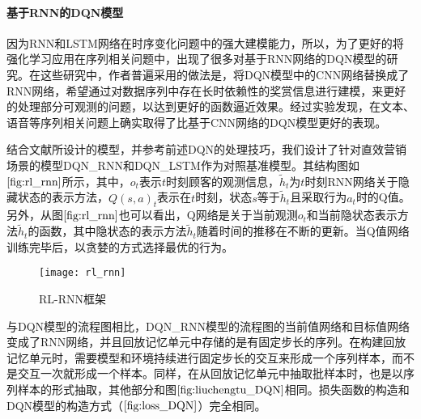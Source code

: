 

\paragraph{基于RNN的DQN模型}
因为RNN和LSTM网络在时序变化问题中的强大建模能力，所以，为了更好的将强化学习应用在序列相关问题中，出现了很多对基于RNN网络的DQN模型的研究\citep{hausknecht2015deep,narasimhan2015language}。在这些研究中，作者普遍采用的做法是，将DQN模型中的CNN网络替换成了RNN网络，希望通过对数据序列中存在长时依赖性的奖赏信息进行建模，来更好的处理部分可观测的问题\citep{bakker2002reinforcement,hausknecht2015deep,lin1993reinforcement,narasimhan2015language}，以达到更好的函数逼近效果。经过实验发现，在文本、语音等序列相关问题上确实取得了比基于CNN网络的DQN模型更好的表现。


结合文献\citep{hausknecht2015deep,narasimhan2015language}所设计的模型，并参考前述DQN的处理技巧，我们设计了针对直效营销场景的模型DQN\_RNN和DQN\_LSTM作为对照基准模型。其结构图如$\ref{fig:rl_rnn}$所示，其中，$o_{t}$表示$t$时刻顾客的观测信息，$\tilde{h}_{t}$为$t$时刻RNN网络关于隐藏状态的表示方法，$Q(s,a)_{t}$表示在$t$时刻，状态$s$等于$\tilde{h}_{t}$且采取行为$a_{t}$时的Q值。另外，从图$\ref{fig:rl_rnn}$也可以看出，Q网络是关于当前观测$o_{t}$和当前隐状态表示方法$\tilde{h}_{t}$的函数，其中隐状态的表示方法$\tilde{h}_{t}$随着时间的推移在不断的更新。当Q值网络训练完毕后，以贪婪的方式选择最优的行为。
\begin{figure}[htbp]
\centering
\texttt{[image: rl\_rnn]}
\caption{RL-RNN框架}
\label{fig:rl_rnn}
\end{figure}

与DQN模型的流程图相比，DQN\_RNN模型的流程图的当前值网络和目标值网络变成了RNN网络，并且回放记忆单元中存储的是有固定步长的序列。在构建回放记忆单元时，需要模型和环境持续进行固定步长的交互来形成一个序列样本，而不是交互一次就形成一个样本。同样，在从回放记忆单元中抽取批样本时，也是以序列样本的形式抽取，其他部分和图$\ref{fig:liuchengtu_DQN}$相同。损失函数的构造和DQN模型的构造方式（$\ref{fig:loss_DQN}$）完全相同。

